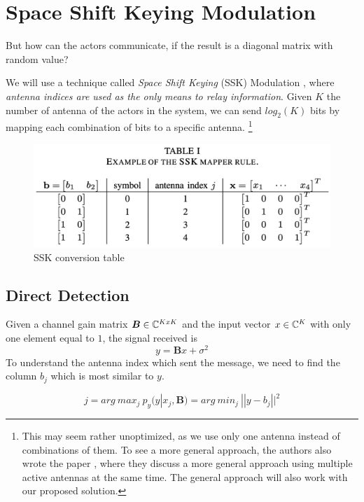 \section{Space Shift Keying Modulation}
But how can the actors communicate, if the result is a diagonal matrix with random value?

We will use a technique called \textit{Space Shift Keying} (SSK) Modulation \cite{5165332}, where \textit{antenna indices are used as the only means to relay information}. Given $K$ the number of antenna of the actors in the system, we can send $log_2(K)$ bits by mapping each combination of bits to a specific antenna.
\footnote{This may seem rather unoptimized, as we use only one antenna instead of combinations of them. To see a more general approach, the authors also wrote the paper \cite{4699782}, where they discuss a more general approach using multiple active antennas at the same time. The general approach will also work with our proposed solution.}

\begin{figure}[H]
  \centering
  \includegraphics[width=\linewidth]{imgs/ssk_conversion_table.png}
  \caption{SSK conversion table}
  \label{fig:ssk_conversion_table}
\end{figure}

\subsection{Direct Detection}
Given a channel gain matrix $\bm{B} \in \mathbb{C}^{KxK}$ and the input vector $x \in \mathbb{C}^K$ with only one element equal to $1$, the signal received is
\begin{equation}
  y = \bm{B}x + \sigma^2
\end{equation}
To understand the antenna index which sent the message, we need to find the column $b_j$ which is most similar to $y$.

\begin{equation}
  j = arg\ max_j\ p_y (y | x_j, \bm{B}) = arg\ min_j\ || y - b_j ||^2
  \label{eq:direct_detection}
\end{equation}

